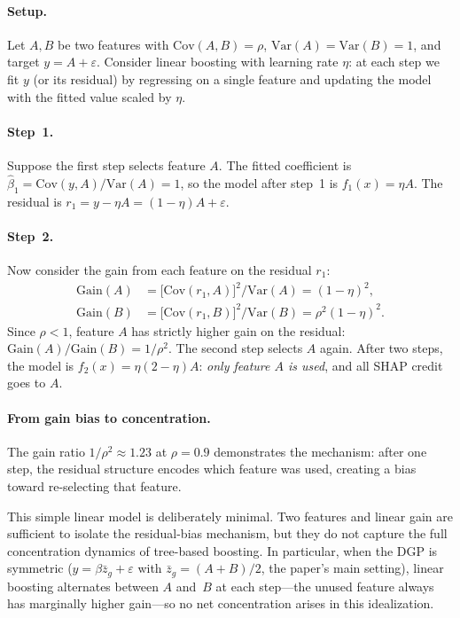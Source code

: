 \documentclass[11pt]{article}
\newcommand{\rhovar}{\rho}
\begin{document}
\paragraph{Setup.}
Let $A, B$ be two features with $\text{Cov}(A, B) = \rho$,
$\text{Var}(A) = \text{Var}(B) = 1$, and target $y = A + \varepsilon$.
Consider linear boosting with learning rate $\eta$: at each step we
fit $y$ (or its residual) by regressing on a single feature and updating
the model with the fitted value scaled by $\eta$.

\paragraph{Step~1.}
Suppose the first step selects feature $A$.  The fitted coefficient is
$\hat{\beta}_1 = \text{Cov}(y, A)/\text{Var}(A) = 1$, so the model
after step~1 is $f_1(x) = \eta A$.  The residual is
$r_1 = y - \eta A = (1 - \eta) A + \varepsilon$.

\paragraph{Step~2.}
Now consider the gain from each feature on the residual $r_1$:
\begin{align}
  \text{Gain}(A) &= \bigl[\text{Cov}(r_1, A)\bigr]^2 / \text{Var}(A) = (1 - \eta)^2, \\
  \text{Gain}(B) &= \bigl[\text{Cov}(r_1, B)\bigr]^2 / \text{Var}(B) = \rho^2(1 - \eta)^2.
\end{align}
Since $\rho < 1$, feature $A$ has strictly higher gain on the residual:
$\text{Gain}(A) / \text{Gain}(B) = 1/\rho^2$.  The second step selects
$A$ again.  After two steps, the model is $f_2(x) = \eta(2 - \eta) A$:
\emph{only feature $A$ is used}, and all SHAP credit goes to $A$.

\paragraph{From gain bias to concentration.}
The gain ratio $1/\rho^2 \approx 1.23$ at $\rhovar = 0.9$ demonstrates
the mechanism: after one step, the residual structure encodes which
feature was used, creating a bias toward re-selecting that feature.

This simple linear model is deliberately minimal.  Two features and
linear gain are sufficient to isolate the residual-bias mechanism, but
they do not capture the full concentration dynamics of tree-based
boosting.  In particular, when the DGP is symmetric
($y = \beta \bar{z}_g + \varepsilon$ with $\bar{z}_g = (A + B)/2$,
the paper's main setting), linear boosting alternates between $A$
and~$B$ at each step---the unused feature always has marginally higher
gain---so no net concentration arises in this idealization.
\end{document}
